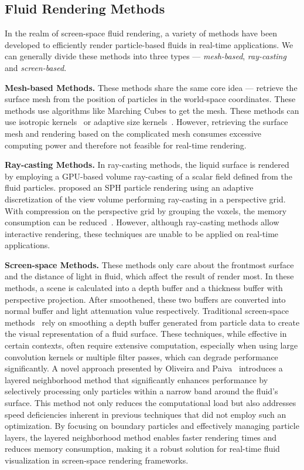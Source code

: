 \documentclass[sigconf]{acmart}
\begin{document}
\subsection{Fluid Rendering Methods}
In the realm of screen-space fluid rendering, a variety of methods have been developed to efficiently render particle-based fluids in real-time applications. We can generally divide these methods into three types --- \textit{mesh-based}, \textit{ray-casting} and \textit{screen-based}.

\textbf{Mesh-based Methods.} These methods share the same core idea --- retrieve the surface mesh from the position of particles in the world-space coordinates. These methods use algorithms like Marching Cubes to get the mesh. These methods
can use isotropic kernels~\cite{solenthaler2007unified} or adaptive size kernels~\cite{adams2007adaptively}. However, retrieving the surface mesh and rendering based on the complicated mesh consumes excessive computing power and therefore not feasible for real-time rendering.

\textbf{Ray-casting Methods.} In ray-casting methods, the liquid surface is rendered by employing a GPU-based volume ray-casting of a scalar field defined from the fluid particles. \citet{fraedrich2010efficient} proposed an SPH particle rendering using an adaptive discretization of the view volume performing ray-casting in a perspective grid. With compression on the perspective grid by grouping the voxels, the memory consumption can be reduced~\cite{zirr2015memory}. However, although ray-casting methods allow interactive rendering, these techniques are unable to be applied on
real-time applications.

\textbf{Screen-space Methods.} These methods only care about the frontmost surface and the distance of light in fluid, which affect the result of render most. In these methods, a scene is calculated into a depth buffer and a thickness buffer with perspective projection. After smoothened, these two buffers are converted into normal buffer and light attenuation value respectively. Traditional screen-space methods~\cite{cords2009interactive, bagar2010layered} rely on smoothing a depth buffer generated from particle data to create the visual representation of a fluid surface. These techniques, while effective in certain contexts, often require extensive computation, especially when using large convolution kernels or multiple filter passes, which can degrade performance significantly. A novel approach presented by Oliveira and Paiva~\cite{oliveira2022narrow} introduces a layered neighborhood method that significantly enhances performance by selectively processing only particles within a narrow band around the fluid's surface. This method not only reduces the computational load but also addresses speed deficiencies inherent in previous techniques that did not employ such an optimization. By focusing on boundary particles and effectively managing particle layers, the layered neighborhood method enables faster rendering times and reduces memory consumption, making it a robust solution for real-time fluid visualization in screen-space rendering frameworks.
\end{document}
